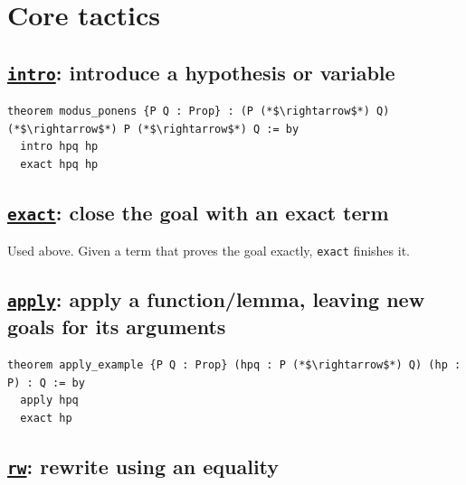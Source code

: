 \section{Core tactics}\label{sec:04-tactics:02-core-tactics:1}

\subsection{\texorpdfstring{\href{https://lean-lang.org/doc/reference/latest/Tactic-Proofs/Tactic-Reference/}{\texttt{intro}}: introduce a hypothesis or variable}{intro: introduce a hypothesis or variable}}\label{sec:04-tactics:02-core-tactics:2}

\begin{lstlisting}
theorem modus_ponens {P Q : Prop} : (P (*$\rightarrow$*) Q) (*$\rightarrow$*) P (*$\rightarrow$*) Q := by
  intro hpq hp
  exact hpq hp
\end{lstlisting}

\subsection{\texorpdfstring{\href{https://lean-lang.org/doc/reference/latest/Tactic-Proofs/Tactic-Reference/}{\texttt{exact}}: close the goal with an exact term}{exact: close the goal with an exact term}}\label{sec:04-tactics:02-core-tactics:3}

Used above. Given a term that proves the goal exactly, \texttt{exact} finishes it.

\subsection{\texorpdfstring{\href{https://lean-lang.org/doc/reference/latest/Tactic-Proofs/Tactic-Reference/}{\texttt{apply}}: apply a function/lemma, leaving new goals for its arguments}{apply: apply a function/lemma, leaving new goals for its arguments}}\label{sec:04-tactics:02-core-tactics:4}

\begin{lstlisting}
theorem apply_example {P Q : Prop} (hpq : P (*$\rightarrow$*) Q) (hp : P) : Q := by
  apply hpq
  exact hp
\end{lstlisting}

\subsection{\texorpdfstring{\href{https://lean-lang.org/doc/reference/latest/Tactic-Proofs/Tactic-Reference/}{\texttt{rw}}: rewrite using an equality}{rw: rewrite using an equality}}\label{sec:04-tactics:02-core-tactics:5}

